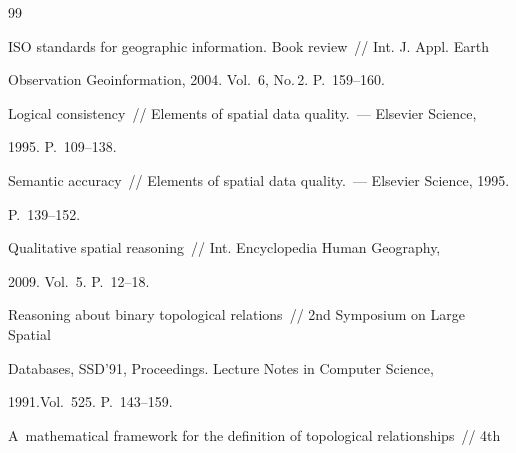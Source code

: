 {\small\frenchspacing


{%




\begin{thebibliography}{99}






ISO standards for geographic information. Book review~/\!\!/ Int. J. Appl. Earth 


Observation Geoinformation, 2004. Vol.~6, No.\,2. P.~159--160.









Logical consistency~/\!\!/ Elements of spatial data quality.~---  Elsevier Science, 


1995. P.~109--138. 









Semantic accuracy~/\!\!/ Elements of spatial data quality.~---  Elsevier Science, 1995. 


P.~139--152. 









Qualitative spatial reasoning~/\!\!/ Int. Encyclopedia Human Geography, 


2009. Vol.~5. P.~12--18.









Reasoning about binary topological relations~/\!\!/ 2nd Symposium on Large Spatial 


Databases, SSD'91, Proceedings. Lecture Notes in Computer Science, 


1991.Vol.~525. P.~143--159.









A~mathematical framework for the definition of topological relationships~/\!\!/ 4th 



\end{thebibliography}}}
